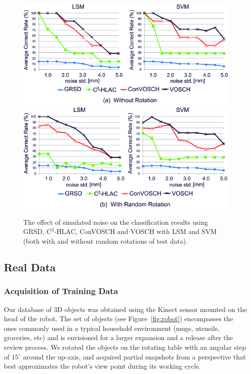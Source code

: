 \documentclass[a4paper, 10 pt, conference]{sty/ieeeconf}
\begin{document}
\begin{figure}[tb!]
  \centering
  \includegraphics[width=.49\textwidth]{figures/synthetic_experiment/synthetic_experimental_result_1.png}
  \includegraphics[width=.49\textwidth]{figures/synthetic_experiment/synthetic_experimental_result_2.png}
  \caption{The effect of simulated noise on the classification results using GRSD, C$^3$-HLAC, ConVOSCH and VOSCH with LSM and SVM
    (both with and without random rotations of test data).}
  \label{fig:synthetic}
\end{figure}


\subsection{Real Data}
\label{sec:real_data}
\subsubsection{Acquisition of Training Data}
Our database of 3D objects was obtained using the Kinect sensor mounted on the head of the robot.
The set of objects (see Figure~\ref{fig:robot}) encompasses the ones commonly used
in a typical household environment (mugs, utensils, groceries, etc) and is envisioned for a
larger expansion and a release after the review process. We rotated the objects on the rotating table with
an angular step of $15^\circ$ around the up-axis, and acquired partial
snapshots from a perspective that best approximates the robot's view point during its working cycle.  

\end{document}
